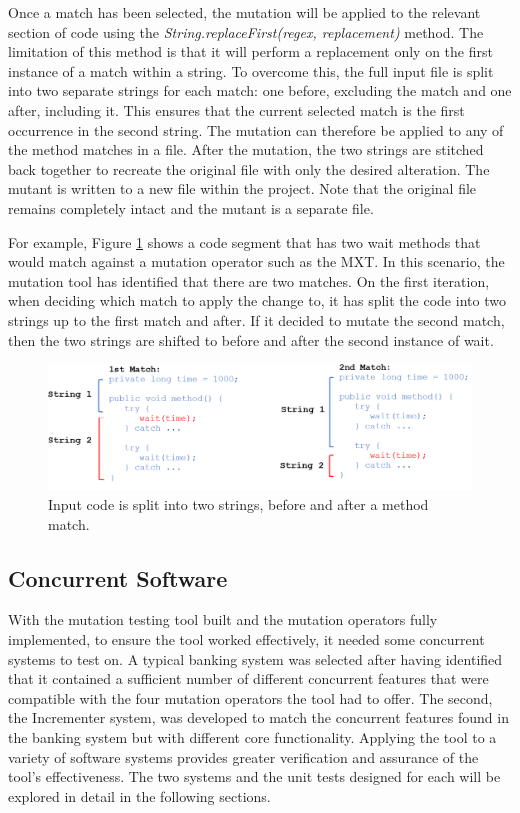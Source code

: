 \documentclass[a4paper,12pt]{article}
\begin{document}
Once a match has been selected, the mutation will be applied to the relevant section of code using the \textit{String.replaceFirst(regex, replacement)} method. The limitation of this method is that it will perform a replacement only on the first instance of a match within a string. To overcome this, the full input file is split into two separate strings for each match: one before, excluding the match and one after, including it. This ensures that the current selected match is the first occurrence in the second string. The mutation can therefore be applied to any of the method matches in a file. After the mutation, the two strings are stitched back together to recreate the original file with only the desired alteration. The mutant is written to a new file within the project. Note that the original file remains completely intact and the mutant is a separate file.

For example, Figure \ref{fig:rand_match} shows a code segment that has two wait methods that would match against a mutation operator such as the MXT. In this scenario, the mutation tool has identified that there are two matches. On the first iteration, when deciding which match to apply the change to, it has split the code into two strings up to the first match and after. If it decided to mutate the second match, then the two strings are shifted to before and after the second instance of wait. 

\begin{figure}[h]
    \hspace{-1.6cm}
    \includegraphics[scale =0.4]{random_match.png}
    \caption{Input code is split into two strings, before and after a method match.}
    \label{fig:rand_match}
\end{figure}


\subsection{Concurrent Software}

With the mutation testing tool built and the mutation operators fully implemented, to ensure the tool worked effectively, it needed some concurrent systems to test on. A typical banking system was selected after having identified that it contained a sufficient number of different concurrent features that were compatible with the four mutation operators the tool had to offer. The second, the Incrementer system, was developed to match the concurrent features found in the banking system but with different core functionality. Applying the tool to a variety of software systems provides greater verification and assurance of the tool's effectiveness. The two systems and the unit tests designed for each will be explored in detail in the following sections.
\end{document}
